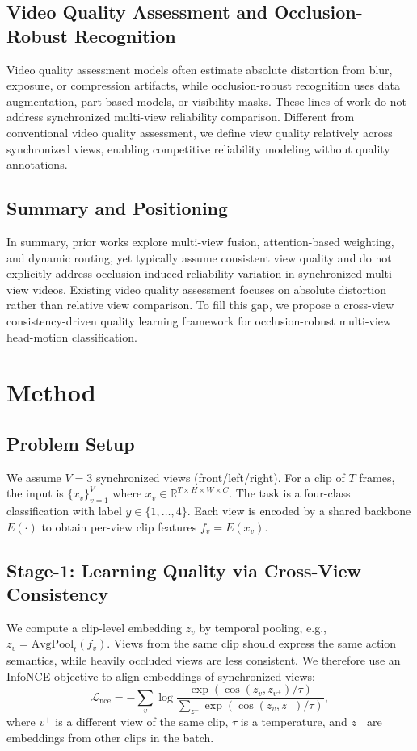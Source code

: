 \documentclass[runningheads]{llncs}
\begin{document}
\subsection{Video Quality Assessment and Occlusion-Robust Recognition}
Video quality assessment models often estimate absolute distortion from blur, exposure, or compression artifacts, while occlusion-robust recognition uses data augmentation, part-based models, or visibility masks. These lines of work do not address synchronized multi-view reliability comparison. Different from conventional video quality assessment, we define view quality relatively across synchronized views, enabling competitive reliability modeling without quality annotations.

\subsection{Summary and Positioning}
In summary, prior works explore multi-view fusion, attention-based weighting, and dynamic routing, yet typically assume consistent view quality and do not explicitly address occlusion-induced reliability variation in synchronized multi-view videos. Existing video quality assessment focuses on absolute distortion rather than relative view comparison. To fill this gap, we propose a cross-view consistency-driven quality learning framework for occlusion-robust multi-view head-motion classification.

\section{Method}
\label{sec:method}

\subsection{Problem Setup}
We assume $V=3$ synchronized views (front/left/right). For a clip of $T$ frames, the input is $\{x_v\}_{v=1}^{V}$ where $x_v \in \mathbb{R}^{T \times H \times W \times C}$. The task is a four-class classification with label $y \in \{1,\dots,4\}$. Each view is encoded by a shared backbone $E(\cdot)$ to obtain per-view clip features $f_v = E(x_v)$.

\subsection{Stage-1: Learning Quality via Cross-View Consistency}
We compute a clip-level embedding $z_v$ by temporal pooling, e.g., $z_v = \text{AvgPool}_t(f_v)$. Views from the same clip should express the same action semantics, while heavily occluded views are less consistent. We therefore use an InfoNCE objective to align embeddings of synchronized views:
\begin{equation}
\mathcal{L}_{\text{nce}} = - \sum_{v} \log \frac{\exp(\cos(z_v, z_{v^+})/\tau)}{\sum_{z^-} \exp(\cos(z_v, z^-)/\tau)} ,
\label{equ:nce}
\end{equation}
where $v^+$ is a different view of the same clip, $\tau$ is a temperature, and $z^-$ are embeddings from other clips in the batch.
\end{document}
